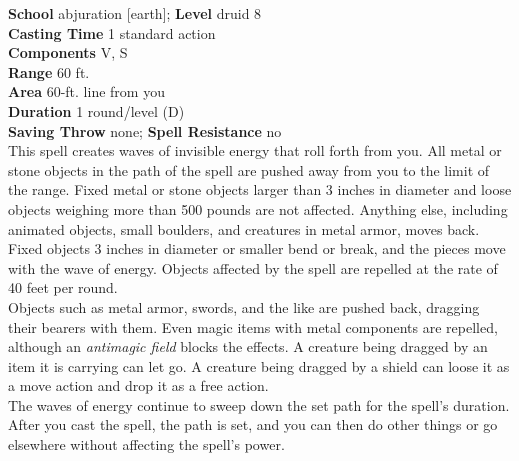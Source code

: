\textbf{School} abjuration [earth]; \textbf{Level} druid 8\\
\textbf{Casting Time} 1 standard action\\
\textbf{Components} V, S\\
\textbf{Range} 60 ft.\\
\textbf{Area} 60-ft. line from you\\
\textbf{Duration} 1 round/level (D)\\
\textbf{Saving Throw} none; \textbf{Spell Resistance} no\\
This spell creates waves of invisible energy that roll forth from you. All metal or stone objects in the path of the spell are pushed away from you to the limit of the range. Fixed metal or stone objects larger than 3 inches in diameter and loose objects weighing more than 500 pounds are not affected. Anything else, including animated objects, small boulders, and creatures in metal armor, moves back. Fixed objects 3 inches in diameter or smaller bend or break, and the pieces move with the wave of energy. Objects affected by the spell are repelled at the rate of 40 feet per round.\\
Objects such as metal armor, swords, and the like are pushed back, dragging their bearers with them. Even magic items with metal components are repelled, although an \textit{antimagic field }blocks the effects. A creature being dragged by an item it is carrying can let go. A creature being dragged by a shield can loose it as a move action and drop it as a free action.\\
The waves of energy continue to sweep down the set path for the spell's duration. After you cast the spell, the path is set, and you can then do other things or go elsewhere without affecting the spell's power.\\
